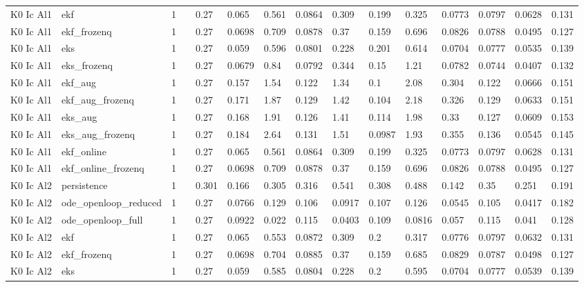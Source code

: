 \begin{table}[t]
\begin{tabular}{lllllllllllllll}
K0 Ic Al1 & ekf & 1 &  & 0.27 & 0.065 & 0.561 & 0.0864 & 0.309 & 0.199 & 0.325 & 0.0773 & 0.0797 & 0.0628 & 0.131 \\
K0 Ic Al1 & ekf\_frozenq & 1 &  & 0.27 & 0.0698 & 0.709 & 0.0878 & 0.37 & 0.159 & 0.696 & 0.0826 & 0.0788 & 0.0495 & 0.127 \\
K0 Ic Al1 & eks & 1 &  & 0.27 & 0.059 & 0.596 & 0.0801 & 0.228 & 0.201 & 0.614 & 0.0704 & 0.0777 & 0.0535 & 0.139 \\
K0 Ic Al1 & eks\_frozenq & 1 &  & 0.27 & 0.0679 & 0.84 & 0.0792 & 0.344 & 0.15 & 1.21 & 0.0782 & 0.0744 & 0.0407 & 0.132 \\
K0 Ic Al1 & ekf\_aug & 1 &  & 0.27 & 0.157 & 1.54 & 0.122 & 1.34 & 0.1 & 2.08 & 0.304 & 0.122 & 0.0666 & 0.151 \\
K0 Ic Al1 & ekf\_aug\_frozenq & 1 &  & 0.27 & 0.171 & 1.87 & 0.129 & 1.42 & 0.104 & 2.18 & 0.326 & 0.129 & 0.0633 & 0.151 \\
K0 Ic Al1 & eks\_aug & 1 &  & 0.27 & 0.168 & 1.91 & 0.126 & 1.41 & 0.114 & 1.98 & 0.33 & 0.127 & 0.0609 & 0.153 \\
K0 Ic Al1 & eks\_aug\_frozenq & 1 &  & 0.27 & 0.184 & 2.64 & 0.131 & 1.51 & 0.0987 & 1.93 & 0.355 & 0.136 & 0.0545 & 0.145 \\
K0 Ic Al1 & ekf\_online & 1 &  & 0.27 & 0.065 & 0.561 & 0.0864 & 0.309 & 0.199 & 0.325 & 0.0773 & 0.0797 & 0.0628 & 0.131 \\
K0 Ic Al1 & ekf\_online\_frozenq & 1 &  & 0.27 & 0.0698 & 0.709 & 0.0878 & 0.37 & 0.159 & 0.696 & 0.0826 & 0.0788 & 0.0495 & 0.127 \\
K0 Ic Al2 & persistence & 1 &  & 0.301 & 0.166 & 0.305 & 0.316 & 0.541 & 0.308 & 0.488 & 0.142 & 0.35 & 0.251 & 0.191 \\
K0 Ic Al2 & ode\_openloop\_reduced & 1 &  & 0.27 & 0.0766 & 0.129 & 0.106 & 0.0917 & 0.107 & 0.126 & 0.0545 & 0.105 & 0.0417 & 0.182 \\
K0 Ic Al2 & ode\_openloop\_full & 1 &  & 0.27 & 0.0922 & 0.022 & 0.115 & 0.0403 & 0.109 & 0.0816 & 0.057 & 0.115 & 0.041 & 0.128 \\
K0 Ic Al2 & ekf & 1 &  & 0.27 & 0.065 & 0.553 & 0.0872 & 0.309 & 0.2 & 0.317 & 0.0776 & 0.0797 & 0.0632 & 0.131 \\
K0 Ic Al2 & ekf\_frozenq & 1 &  & 0.27 & 0.0698 & 0.704 & 0.0885 & 0.37 & 0.159 & 0.685 & 0.0829 & 0.0787 & 0.0498 & 0.127 \\
K0 Ic Al2 & eks & 1 &  & 0.27 & 0.059 & 0.585 & 0.0804 & 0.228 & 0.2 & 0.595 & 0.0704 & 0.0777 & 0.0539 & 0.139 \\

\end{tabular}
\end{table}
